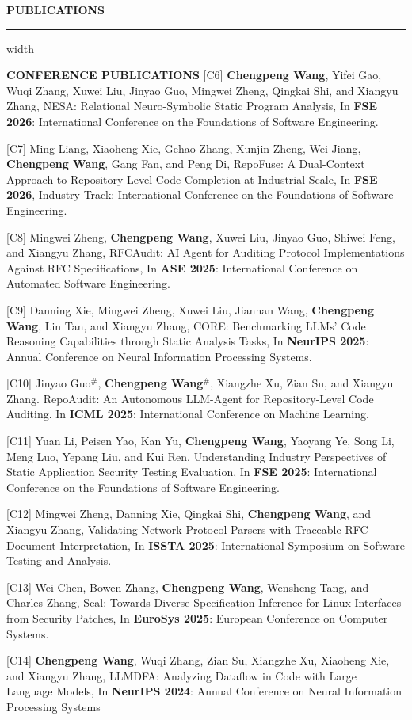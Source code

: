 \documentclass[centered]{resume}
\newlength{\cvsectiongap}
\newenvironment{rSection}[1]{%
  \par\Needspace{5\baselineskip}\addvspace{\cvsectiongap}
  {\bfseries \MakeUppercase{#1}}\vspace{0.65em}%
  \noindent\hrule width \linewidth\vspace{-0.45em}\par
}{\par}
\newenvironment{subsection*}[4]{%
  \par\Needspace{5\baselineskip}\noindent #1\par\nobreak
}{}
\begin{document}
\begin{resume}
\begin{rSection}{Publications}
\begin{subsection*}{\textbf{CONFERENCE PUBLICATIONS}}{}{}{}
[C6] \textbf{Chengpeng Wang}, Yifei Gao, Wuqi Zhang, Xuwei Liu, Jinyao Guo, Mingwei Zheng, Qingkai Shi, and Xiangyu Zhang, NESA: Relational Neuro-Symbolic Static Program Analysis, In \textbf{FSE 2026}: International Conference on the Foundations of Software Engineering.

[C7] Ming Liang, Xiaoheng Xie, Gehao Zhang, Xunjin Zheng, Wei Jiang, \textbf{Chengpeng Wang}, Gang Fan, and Peng Di, RepoFuse: A Dual-Context Approach to Repository-Level Code Completion at Industrial Scale, In \textbf{FSE 2026}, Industry Track: International Conference on the Foundations of Software Engineering.

[C8] Mingwei Zheng, \textbf{Chengpeng Wang}, Xuwei Liu, Jinyao Guo, Shiwei Feng, and Xiangyu Zhang, RFCAudit: AI Agent for Auditing Protocol Implementations Against RFC Specifications, In \textbf{ASE 2025}: International Conference on Automated Software Engineering.

[C9] Danning Xie, Mingwei Zheng, Xuwei Liu, Jiannan Wang, \textbf{Chengpeng Wang}, Lin Tan, and Xiangyu Zhang, CORE: Benchmarking LLMs' Code Reasoning Capabilities through Static Analysis Tasks, In \textbf{NeurIPS 2025}: Annual Conference on Neural Information Processing Systems.

[C10] Jinyao Guo$^\#$, \textbf{Chengpeng Wang}$^\#$, Xiangzhe Xu, Zian Su, and Xiangyu Zhang. RepoAudit: An Autonomous LLM-Agent for Repository-Level Code Auditing. In \textbf{ICML 2025}: International Conference on Machine Learning.

[C11] Yuan Li, Peisen Yao, Kan Yu, \textbf{Chengpeng Wang}, Yaoyang Ye, Song Li, Meng Luo, Yepang Liu, and Kui Ren. Understanding Industry Perspectives of Static Application Security Testing Evaluation, In \textbf{FSE 2025}: International Conference on the Foundations of Software Engineering.

[C12] Mingwei Zheng, Danning Xie, Qingkai Shi, \textbf{Chengpeng Wang}, and Xiangyu Zhang, Validating Network Protocol Parsers with Traceable RFC Document Interpretation, In \textbf{ISSTA 2025}: International Symposium on
Software Testing and Analysis.

[C13] Wei Chen, Bowen Zhang, \textbf{Chengpeng Wang}, Wensheng Tang, and Charles Zhang, Seal: Towards Diverse Specification Inference for Linux Interfaces from Security Patches, In \textbf{EuroSys 2025}: European Conference on Computer Systems.

[C14] \textbf{Chengpeng Wang}, Wuqi Zhang, Zian Su, Xiangzhe Xu, Xiaoheng Xie, and Xiangyu Zhang, LLMDFA: Analyzing Dataflow in Code with Large Language Models, In \textbf{NeurIPS 2024}: Annual Conference on Neural Information Processing Systems


\end{subsection*}
\end{rSection}
\end{resume}
\end{document}
